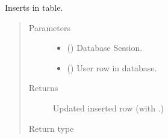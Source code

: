 \documentclass[a4paper,landscape,10pt,english]{sphinxmanual}
\begin{document}
\begin{fulllineitems}
\label{\detokenize{code_docs/simulation_API.model:simulation_API.model.crud._create_user}}
Inserts  in  table.
\begin{quote}\begin{description}
\item[{Parameters}] \leavevmode\begin{itemize}
\item {} 
 () \textendash{} Database Session.

\item {} 
 ({\hyperref[\detokenize{code_docs/simulation_API.controller:simulation_API.controller.schemas.UserDBSchCreate}]{}}) \textendash{} User row in database.

\end{itemize}

\item[{Returns}] \leavevmode
{} \textendash{} Updated inserted row (with {\hyperref[\detokenize{code_docs/simulation_API.model:simulation_API.model.models.UserDB.user_id}]{}}.)

\item[{Return type}] \leavevmode
{\hyperref[\detokenize{code_docs/simulation_API.model:simulation_API.model.models.UserDB}]{}}

\end{description}\end{quote}

\end{fulllineitems}
\end{document}
